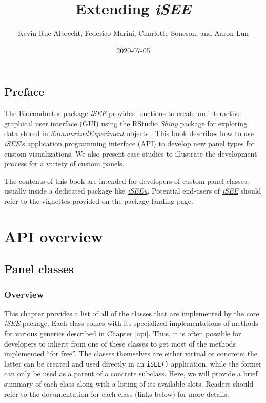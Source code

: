 \documentclass[
]{book}
\title{Extending \emph{iSEE}}
\author{Kevin Rue-Albrecht, Federico Marini, Charlotte Soneson, and Aaron Lun}
\date{2020-07-05}
\begin{document}
\maketitle

{
\setcounter{tocdepth}{1}
\tableofcontents
}
\hypertarget{preface}{%
\chapter*{Preface}\label{preface}}

The \href{https://bioconductor.org/}{Bioconductor} package \emph{\href{https://bioconductor.org/packages/3.11/iSEE}{iSEE}} provides functions to create an interactive graphical user interface (GUI) using the \href{https://rstudio.com/}{RStudio} \emph{\href{https://CRAN.R-project.org/package=Shiny}{Shiny}} package for exploring data stored in \emph{\href{https://bioconductor.org/packages/3.11/SummarizedExperiment}{SummarizedExperiment}} objects \citep{rue2018isee}.
This book describes how to use \emph{\href{https://bioconductor.org/packages/3.11/iSEE}{iSEE}}'s application programming interface (API) to develop new panel types for custom visualizations.
We also present case studies to illustrate the development process for a variety of custom panels.

The contents of this book are intended for developers of custom panel classes, usually inside a dedicated package like \emph{\href{https://bioconductor.org/packages/3.11/iSEEu}{iSEEu}}.
Potential end-users of \emph{\href{https://bioconductor.org/packages/3.11/iSEE}{iSEE}} should refer to the vignettes provided on the package landing page.

\hypertarget{part-api-overview}{%
\part{API overview}\label{part-api-overview}}

\hypertarget{panels}{%
\chapter{Panel classes}\label{panels}}

\hypertarget{overview}{%
\section{Overview}\label{overview}}

This chapter provides a list of all of the classes that are implemented by the core \emph{\href{https://bioconductor.org/packages/3.11/iSEE}{iSEE}} package.
Each class comes with its specialized implementations of methods for various generics described in Chapter \ref{api}.
Thus, it is often possible for developers to inherit from one of these classes to get most of the methods implemented ``for free''.
The classes themselves are either virtual or concrete; the latter can be created and used directly in an \texttt{iSEE()} application, while the former can only be used as a parent of a concrete subclass.
Here, we will provide a brief summary of each class along with a listing of its available slots.
Readers should refer to the documentation for each class (links below) for more details.
\end{document}
